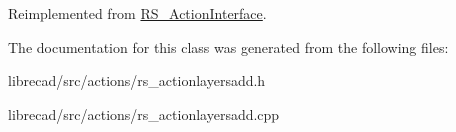 Reimplemented from \hyperlink{classRS__ActionInterface_aa2ba8f6f697f735eace4ec5449c0b8cd}{R\-S\-\_\-\-Action\-Interface}.



The documentation for this class was generated from the following files\-:\begin{DoxyCompactItemize}
\item 
librecad/src/actions/rs\-\_\-actionlayersadd.\-h\item 
librecad/src/actions/rs\-\_\-actionlayersadd.\-cpp\end{DoxyCompactItemize}
